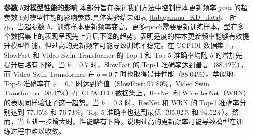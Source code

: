 \documentclass[10.5pt,letterpaper]{article}
\begin{document}
\begin{table}[!h]
\centering
\caption{Model performance of distillation with different $\alpha$}
\small
{}
\label{tab.alpha-sth-k400}
\end{table}


\textbf{参数 $b$对模型性能的影响}
本部分旨在探讨我们方法中控制样本更新频率 $gain$ 的超参数 $b$对模型性能的影响参数,具体实验结果如表 \ref{tab.gamma_KD_data}、 所示，当超参数 $b$，训练样本更新频率变高，更多epoch需要更新训练样本，型在多个数据集上的表现呈现先上升后下降的趋势，表明适度的样本更新频率能够有效提升模型性能，但过高的更新频率可能导致训练不稳定。在 UCF101 数据集上，SlowFast 和 Video Swin Transformer 的 Top-1 和 Top-5 准确率均随 $b$ 的增加先提升后略有下降。当 $b=0.7$ 时，SlowFast 的 Top-1 准确率达到最高（88.42\%），而 Video Swin Transformer 在 $b=0.7$ 时也取得最佳性能（88.04\%）。类似地，Top-5 准确率在 $b=0.7$ 时达到峰值（SlowFast: 97.80\%，Video Swin Transformer: 98.07\%）在 CIFAR100 数据集上，ResNet 和 WideResNet（WRN）的表现同样验证了这一趋势。当 $b=0.3$ 时，ResNet 和 WRN 的 Top-1 准确率分别达到 77.95\% 和 76.73\%，Top-5 准确率也达到最优（95.02\% 和 94.52\%）。然而，当 $b$ 进一步增大时，性能略有下降，说明过高的更新频率可能导致模型在训练过程中难以收敛。
\end{document}
